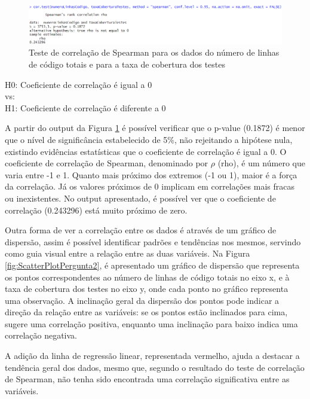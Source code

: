 \documentclass[%
 aip,
cp,  %
 amsmath,amssymb,%
 reprint,%
]{revtex4-2}
\begin{document}
\begin{figure}[!h]
    \centering
    \includegraphics[width=1\linewidth]{imagens//questao2/pergunta2TesteCorrelacaoSpearman.png}
    \caption{Teste de correlação de Spearman para os dados do número de linhas de código totais e para a taxa de cobertura dos testes}
    \label{fig:TesteCorrelacaoSpearmanPergunta2}
\end{figure}



\begin{center}
H0: Coeficiente de correlação é igual a 0 \\ vs: \\ H1: Coeficiente de correlação é diferente a 0
\end{center}

A partir do output da Figura \ref{fig:TesteCorrelacaoSpearmanPergunta2} é possível verificar que o p-value (0.1872) é menor que o nível de significância estabelecido de 5\%, não rejeitando a hipótese nula, existindo evidências estatísticas que o coeficiente de correlação é igual a 0.
O coeficiente de correlação de Spearman, denominado por $\rho $ (rho), é um número que varia entre -1 e 1. Quanto mais próximo dos extremos (-1 ou 1), maior é a força da correlação. Já os valores próximos de 0 implicam em correlações mais fracas ou inexistentes. No output apresentado, é possível ver que o coeficiente de correlação (0.243296) está muito próximo de zero.

Outra forma de ver a correlação entre os dados é através de um gráfico de dispersão, assim é possível identificar padrões e tendências nos mesmos, servindo como guia visual entre a relação entre as duas variáveis.
Na Figura \ref{fig:ScatterPlotPergunta2}, é apresentado um gráfico de dispersão que representa os pontos correspondentes ao número de linhas de código totais no eixo x, e à taxa de cobertura dos testes no eixo y, onde cada ponto no gráfico representa uma observação. A inclinação geral da dispersão dos pontos pode indicar a direção da relação entre as variáveis: se os pontos estão inclinados para cima, sugere uma correlação positiva, enquanto uma inclinação para baixo indica uma correlação negativa.

A adição da linha de regressão linear, representada  vermelho, ajuda a destacar a tendência geral dos dados, mesmo que, segundo o resultado do teste de correlação de Spearman, não tenha sido encontrada uma correlação significativa entre as variáveis.
\end{document}
